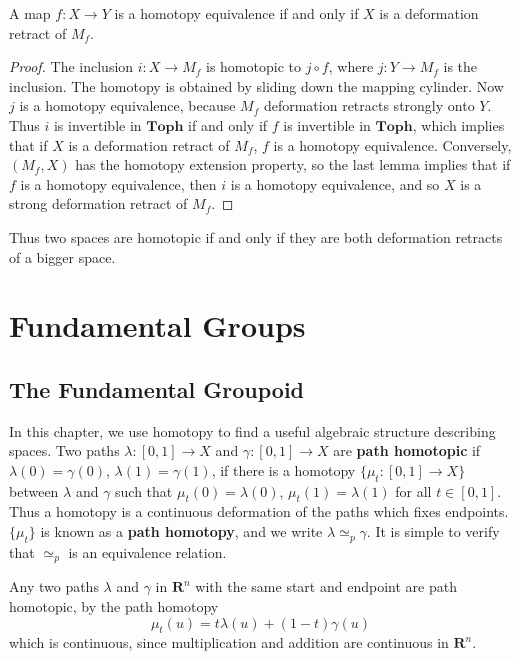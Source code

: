\begin{corollary}
    A map $f:X \to Y$ is a homotopy equivalence if and only if $X$ is a deformation retract of $M_f$.
\end{corollary}
\begin{proof}
    The inclusion $i: X \to M_f$ is homotopic to $j \circ f$, where $j: Y \to M_f$ is the inclusion. The homotopy is obtained by sliding down the mapping cylinder. Now $j$ is a homotopy equivalence, because $M_f$ deformation retracts strongly onto $Y$. Thus $i$ is invertible in $\textbf{Toph}$ if and only if $f$ is invertible in $\textbf{Toph}$, which implies that if $X$ is a deformation retract of $M_f$, $f$ is a homotopy equivalence. Conversely, $(M_f, X)$ has the homotopy extension property, so the last lemma implies that if $f$ is a homotopy equivalence, then $i$ is a homotopy equivalence, and so $X$ is a strong deformation retract of $M_f$.
\end{proof}

Thus two spaces are homotopic if and only if they are both deformation retracts of a bigger space.





\chapter{Fundamental Groups}

\section{The Fundamental Groupoid}

In this chapter, we use homotopy to find a useful algebraic structure describing spaces. Two paths $\lambda:[0,1] \to X$ and $\gamma:[0,1] \to X$ are {\bf path homotopic} if $\lambda(0) = \gamma(0)$, $\lambda(1) = \gamma(1)$, if there is a homotopy $\{ \mu_t: [0,1] \to X \}$ between $\lambda$ and $\gamma$ such that $\mu_t(0) = \lambda(0)$, $\mu_t(1) = \lambda(1)$ for all $t \in [0,1]$. Thus a homotopy is a continuous deformation of the paths which fixes endpoints. $\{ \mu_t \}$ is known as a {\bf path homotopy}, and we write $\lambda \simeq_p \gamma$. It is simple to verify that $\simeq_p$ is an equivalence relation.

\begin{example}
    Any two paths $\lambda$ and $\gamma$ in $\mathbf{R}^n$ with the same start and endpoint are path homotopic, by the path homotopy
    \[ \mu_t(u) = t \lambda(u) + (1 - t) \gamma(u) \]
    which is continuous, since multiplication and addition are continuous in $\mathbf{R}^n$.
\end{example}

